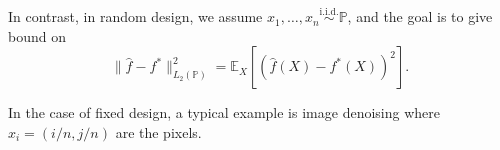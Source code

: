 \begin{note}
	In contrast, in random design, we assume \(x_1, \dots , x_n \overset{\text{i.i.d.} }{\sim } \mathbb{P} \), and the goal is to give bound on
	\[
		\lVert \hat{f} - f^{\ast} \rVert ^2_{L_2(\mathbb{P} )}
		= \mathbb{E}_{X}\left[(\hat{f} (X) - f^{\ast} (X))^2 \right] .
	\]
\end{note}

\begin{eg}
	In the case of fixed design, a typical example is image denoising where \(x_i = (i / n, j / n)\) are the pixels.
\end{eg}